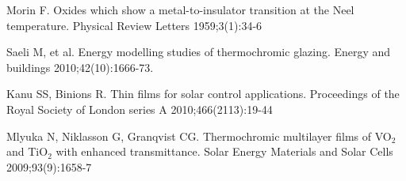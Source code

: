 \begin{thebibliography}{9}
      Morin F.
      Oxides which show a metal-to-insulator transition at the Neel temperature.
      Physical Review Letters 1959;3(1):34-6

      Saeli M, et al.
      Energy modelling studies of thermochromic glazing. 
      Energy and buildings 2010;42(10):1666-73.

      Kanu SS, Binions R. 
      Thin films for solar control applications. 
      Proceedings of the Royal Society of London series A 2010;466(2113):19-44

      Mlyuka N, Niklasson G, Granqvist CG. 
      Thermochromic multilayer films of VO$_2$ and TiO$_2$ with enhanced transmittance.
      Solar Energy Materials and Solar Cells 2009;93(9):1658-7
\end{thebibliography}
